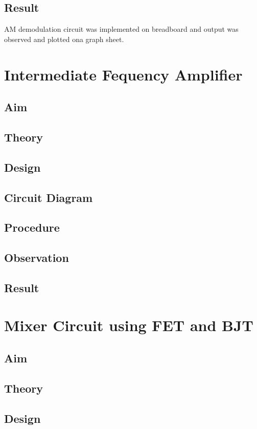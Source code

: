 \documentclass{book}
\begin{document}
\section*{Result}

AM demodulation circuit was implemented on breadboard and output was observed and plotted ona graph sheet.



\chapter[Intermediate Frequency Amplifier]{Intermediate Fequency Amplifier}
\section*{Aim}
\section*{Theory}
\section*{Design}
\section*{Circuit Diagram}
\section*{Procedure}
\section*{Observation}
\section*{Result}

\chapter[Mixer Circuit using FET and BJT]{Mixer Circuit using FET and BJT}
\section*{Aim}
\section*{Theory}
\section*{Design}
\end{document}
